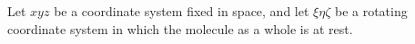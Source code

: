 Let $xyz$ be a coordinate system fixed in space, and let $\xi\eta\zeta$ be a rotating coordinate system in which the molecule as a whole is at rest.
